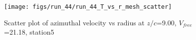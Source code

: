 \begin{figure}[H]
\centering
\texttt{[image: figs/run\_44/run\_44\_T\_vs\_r\_mesh\_scatter]}
\caption{Scatter plot of azimuthal velocity vs radius at $z/c$=9.00, $V_{free}$=21.18, station5}
\label{fig:run_44_T_vs_r_mesh_scatter}
\end{figure}


